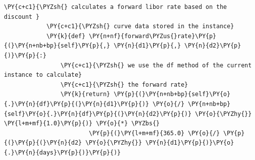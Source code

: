 \begin{Verbatim}[commandchars=\\\{\}]
            \PY{c+c1}{\PYZsh{} calculates a forward libor rate based on the discount }
            \PY{c+c1}{\PYZsh{} curve data stored in the instance}
            \PY{k}{def} \PY{n+nf}{forward\PYZus{}rate}\PY{p}{(}\PY{n+nb+bp}{self}\PY{p}{,} \PY{n}{d1}\PY{p}{,} \PY{n}{d2}\PY{p}{)}\PY{p}{:}
                \PY{c+c1}{\PYZsh{} we use the df method of the current instance to calculate}
                \PY{c+c1}{\PYZsh{} the forward rate}
                \PY{k}{return} \PY{p}{(}\PY{n+nb+bp}{self}\PY{o}{.}\PY{n}{df}\PY{p}{(}\PY{n}{d1}\PY{p}{)} \PY{o}{/} \PY{n+nb+bp}{self}\PY{o}{.}\PY{n}{df}\PY{p}{(}\PY{n}{d2}\PY{p}{)} \PY{o}{\PYZhy{}} \PY{l+m+mf}{1.0}\PY{p}{)} \PY{o}{*} \PYZbs{}
                        \PY{p}{(}\PY{l+m+mf}{365.0} \PY{o}{/} \PY{p}{(}\PY{p}{(}\PY{n}{d2} \PY{o}{\PYZhy{}} \PY{n}{d1}\PY{p}{)}\PY{o}{.}\PY{n}{days}\PY{p}{)}\PY{p}{)}
\end{Verbatim}

